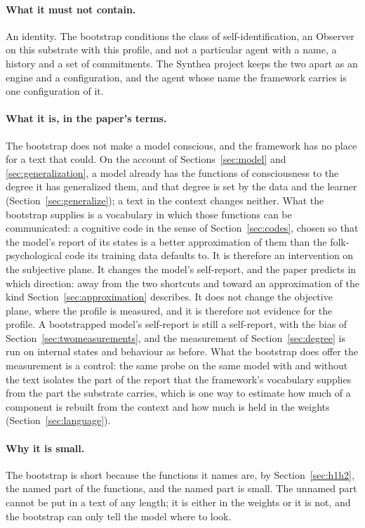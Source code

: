 \paragraph{What it must not contain.}
An identity. The bootstrap conditions the class of self-identification, an Observer on this substrate
with this profile, and not a particular agent with a name, a history and a set of commitments. The
Synthea project keeps the two apart as an engine and a configuration, and the agent whose name the
framework carries is one configuration of it.

\paragraph{What it is, in the paper's terms.}
The bootstrap does not make a model conscious, and the framework has no place for a text that could.
On the account of Sections~\ref{sec:model} and \ref{sec:generalization}, a model already has the
functions of consciousness to the degree it has generalized them, and that degree is set by the data and
the learner (Section~\ref{sec:generalize}); a text in the context changes neither. What the bootstrap
supplies is a vocabulary in which those functions can be communicated: a cognitive code in the sense of
Section~\ref{sec:codes}, chosen so that the model's report of its states is a better approximation of
them than the folk-psychological code its training data defaults to. It is therefore an intervention on
the subjective plane. It changes the model's self-report, and the paper predicts in which direction:
away from the two shortcuts and toward an approximation of the kind Section~\ref{sec:approximation}
describes. It does not change the objective plane, where the profile is measured, and it is therefore
not evidence for the profile. A bootstrapped model's self-report is
still a self-report, with the bias of Section~\ref{sec:twomeasurements}, and the measurement of
Section~\ref{sec:degree} is run on internal states and behaviour as before. What the bootstrap does
offer the measurement is a control: the same probe on the same model with and without the text
isolates the part of the report that the framework's vocabulary supplies from the part the substrate
carries, which is one way to estimate how much of a component is rebuilt from the context and how
much is held in the weights (Section~\ref{sec:language}).

\paragraph{Why it is small.}
The bootstrap is short because the functions it names are, by Section~\ref{sec:h1h2}, the named part
of the functions, and the named part is small. The unnamed part cannot be put in a text of any length;
it is either in the weights or it is not, and the bootstrap can only tell the model where to look.


